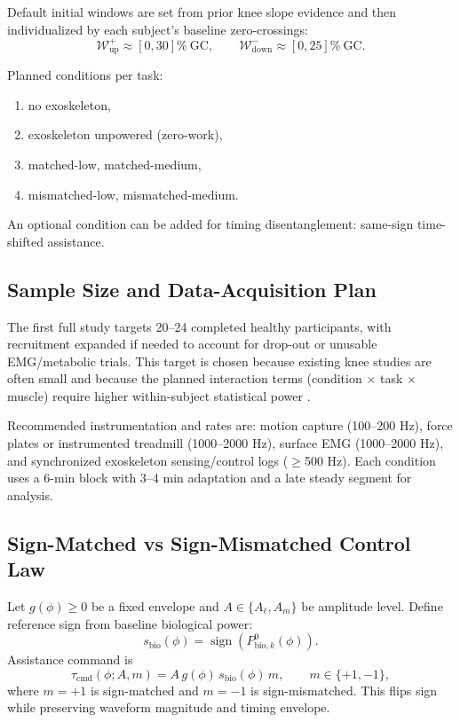 \documentclass[lettersize,journal]{IEEEtran}
\begin{document}
Default initial windows are set from prior knee slope evidence and then individualized by each subject's baseline zero-crossings:
\begin{equation}
\mathcal{W}_{\mathrm{up}}^{+}\approx [0,30]\%\ \text{GC},\qquad
\mathcal{W}_{\mathrm{down}}^{-}\approx [0,25]\%\ \text{GC}.
\label{eq:default_windows}
\end{equation}

Planned conditions per task:
\begin{enumerate}
    \item no exoskeleton,
    \item exoskeleton unpowered (zero-work),
    \item matched-low, matched-medium,
    \item mismatched-low, mismatched-medium.
\end{enumerate}
An optional condition can be added for timing disentanglement: same-sign time-shifted assistance.

\subsection{Sample Size and Data-Acquisition Plan}
The first full study targets 20--24 completed healthy participants, with recruitment expanded if needed to account for drop-out or unusable EMG/metabolic trials. This target is chosen because existing knee studies are often small and because the planned interaction terms (condition $\times$ task $\times$ muscle) require higher within-subject statistical power \cite{park2020hingefree,mclean2019energetics,lee2023context}.

Recommended instrumentation and rates are: motion capture (100--200 Hz), force plates or instrumented treadmill (1000--2000 Hz), surface EMG (1000--2000 Hz), and synchronized exoskeleton sensing/control logs ($\ge$500 Hz). Each condition uses a 6-min block with 3--4 min adaptation and a late steady segment for analysis.

\subsection{Sign-Matched vs Sign-Mismatched Control Law}
Let $g(\phi)\ge 0$ be a fixed envelope and $A\in\{A_{\ell},A_m\}$ be amplitude level. Define reference sign from baseline biological power:
\begin{equation}
s_{\mathrm{bio}}(\phi)=\operatorname{sign}\!\left(P_{\mathrm{bio},k}^{0}(\phi)\right).
\label{eq:sbio}
\end{equation}
Assistance command is
\begin{equation}
\tau_{\mathrm{cmd}}(\phi;A,m)=A\,g(\phi)\,s_{\mathrm{bio}}(\phi)\,m,
\qquad m\in\{+1,-1\},
\label{eq:tau_cmd}
\end{equation}
where $m=+1$ is sign-matched and $m=-1$ is sign-mismatched. This flips sign while preserving waveform magnitude and timing envelope.
\end{document}
